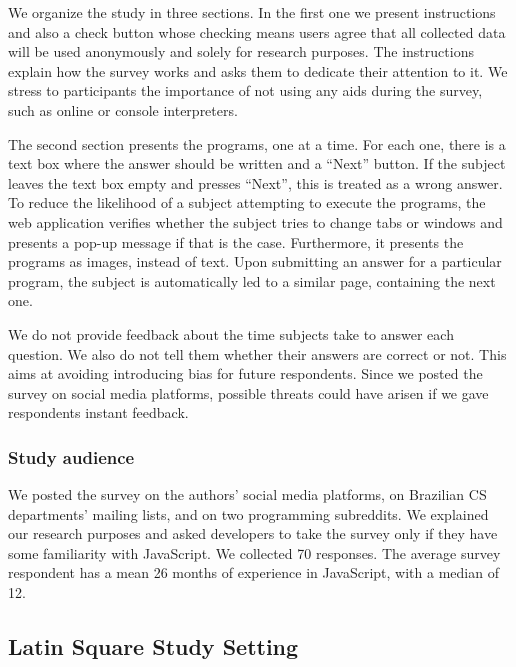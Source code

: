 We organize the study in three sections. In the first one we present instructions and also a check button whose checking means users agree that all collected data will be used anonymously and solely for research purposes. The instructions explain how the survey works and asks them to dedicate their attention to it.  We stress to participants the importance of not using any aids during the survey, such as online or console interpreters. 

The second section presents the programs, one at a time. For each one, there is a text box where the answer should be written and a ``Next'' button. If the subject leaves the text box empty and presses ``Next'', this is treated as a wrong answer. To reduce the likelihood of a subject attempting to execute the programs, the web application verifies whether the subject tries to change tabs or windows and presents a pop-up message if that is the case. Furthermore, it presents the programs as images, instead of text. Upon submitting an answer for a particular program, the subject is automatically led to a similar page, containing the next one.

We do not provide feedback about the time subjects take to answer each question. We also do not tell them whether their answers are correct or not. This aims at avoiding introducing bias for future respondents. Since we posted the survey on social media platforms, possible threats could have arisen if we gave respondents instant feedback.


\subsubsection*{Study audience}

We posted the survey on the authors' social media platforms, on Brazilian CS departments' mailing lists, and on two programming subreddits. We explained our research purposes and asked developers to take the survey only if they have some familiarity with JavaScript. We collected 70 responses. The average survey respondent has a mean 26 months of experience in JavaScript, with a median of 12.


\subsection{Latin Square Study Setting}\label{sec:meth:survey}

